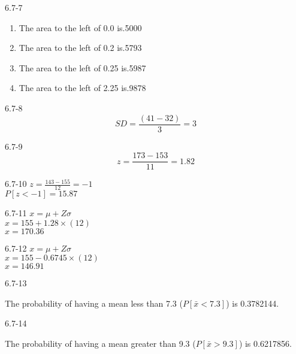 \begin{exsol@solution}{6.7-7}
\begin{enumerate}
\item The area to the left of 0.0 is.5000
\item The area to the left of 0.2 is.5793
\item The area to the left of 0.25 is.5987
\item The area to the left of 2.25 is.9878
\end{enumerate}
\end{exsol@solution}
\begin{exsol@solution}{6.7-8}
	  \begin{equation}
	    SD = \frac{(41 - 32)}{3} = 3
	  \end{equation}
	
\end{exsol@solution}
\begin{exsol@solution}{6.7-9}
	  \begin{equation*}
	    z = \frac{173 - 153}{11} = 1.82
	  \end{equation*}
	
\end{exsol@solution}
\begin{exsol@solution}{6.7-10}
	    $z = \frac{143 - 155}{12} = -1$ \\
	    $P[z < -1] = 15.87$

\end{exsol@solution}
\begin{exsol@solution}{6.7-11}
	    $x = \mu + Z \sigma$ \\
	    $x = 155 + 1.28 \times (12) $ \\
	    $x = 170.36$

\end{exsol@solution}
\begin{exsol@solution}{6.7-12}
	    $x = \mu + Z \sigma$ \\
	    $x = 155 - 0.6745 \times (12) $ \\
	    $x = 146.91$

\end{exsol@solution}
\begin{exsol@solution}{6.7-13}


    The probability of having a mean less than 7.3 ($P[ \bar{x} < 7.3 ]$) is 0.3782144.

\end{exsol@solution}
\begin{exsol@solution}{6.7-14}


    The probability of having a mean greater than 9.3 ($P[ \bar{x} > 9.3 ]$) is 0.6217856.

\end{exsol@solution}
